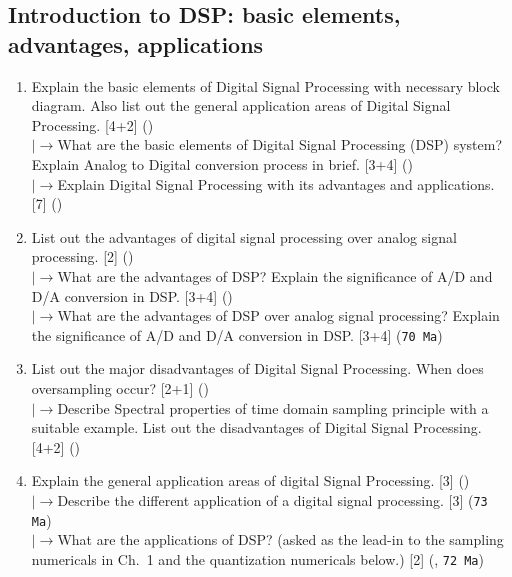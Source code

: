 \documentclass[12pt]{article}
\newcommand{\lb}{\\$\left|\rightarrow\right.$}
\begin{document}
  \subsection{Introduction to DSP: basic elements, advantages, applications}
    \begin{enumerate}[topsep=0pt, noitemsep]
      \item Explain the basic elements of Digital Signal Processing with necessary block diagram. Also list out the general application areas of Digital Signal Processing. \hfill [4+2] ()
        \lb What are the basic elements of Digital Signal Processing (DSP) system? Explain Analog to Digital conversion process in brief. \hfill [3+4] ()
        \lb Explain Digital Signal Processing with its advantages and applications. \hfill [7] ()

      \item List out the advantages of digital signal processing over analog signal processing. \hfill [2] ()
        \lb What are the advantages of DSP? Explain the significance of A/D and D/A conversion in DSP. \hfill [3+4] ()
        \lb What are the advantages of DSP over analog signal processing? Explain the significance of A/D and D/A conversion in DSP. \hfill [3+4] (\texttt{70 Ma})

      \item List out the major disadvantages of Digital Signal Processing. When does oversampling occur? \hfill [2+1] ()
        \lb Describe Spectral properties of time domain sampling principle with a suitable example. List out the disadvantages of Digital Signal Processing. \hfill [4+2] ()

      \item Explain the general application areas of digital Signal Processing. \hfill [3] ()
        \lb Describe the different application of a digital signal processing. \hfill [3] (\texttt{73 Ma})
        \lb What are the applications of DSP? (asked as the lead-in to the sampling numericals in Ch.~1 and the quantization numericals below.) \hfill [2] (, \texttt{72 Ma})
    \end{enumerate}
\end{document}
